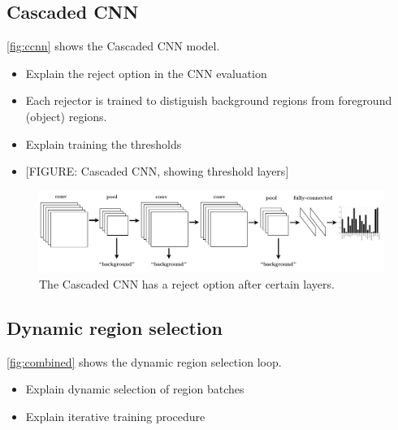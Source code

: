 \subsection{Cascaded CNN}\label{cascaded-cnn}

\autoref{fig:ccnn} shows the Cascaded CNN model.

\begin{itemize}
\itemsep1pt\parskip0pt
\item
  Explain the reject option in the CNN evaluation
\item
  Each rejector is trained to distiguish background regions from foreground (object) regions.
\item
  Explain training the thresholds
\item
  {[}FIGURE: Cascaded CNN, showing threshold layers{]}
\end{itemize}

\begin{figure}[h!]
\begin{center}
\includegraphics[width=0.98\columnwidth]{figures/ccnn.pdf}
\caption{
The Cascaded CNN has a reject option after certain layers.
}\label{fig:ccnn}
\end{center}
\end{figure}


\subsection{Dynamic region selection}\label{dynamic-region-selection}

\autoref{fig:combined} shows the dynamic region selection loop.

\begin{itemize}
\itemsep1pt\parskip0pt
\item
  Explain dynamic selection of region batches
\item
  Explain iterative training procedure
\end{itemize}


